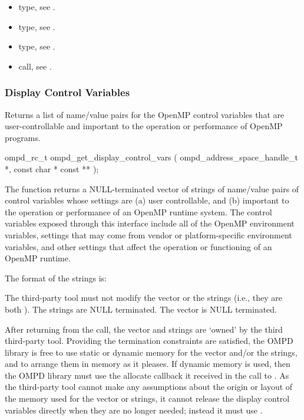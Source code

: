 \crossreferences
\begin{itemize}
	\item {} type, see .
	\item {} type, see .
	\item {} type, see .
	\item {} call, see 
	.
\end{itemize}


\subsubsection{Display Control Variables}

\label{subsubsubsec:ompd_get_display_control_vars}
\summary
Returns a list of name/value pairs for the OpenMP control variables
that are user-controllable and important to the operation or
performance of OpenMP programs.
\format
\begin{cspecific}
\begin{ompSyntax}
ompd_rc_t ompd_get_display_control_vars (
  ompd_address_space_handle_t *,
  const char * const **
);
\end{ompSyntax}
\end{cspecific}

\descr
The function  returns a
NULL-terminated vector of strings of name/value pairs of control
variables whose settings are (a) user controllable,
and (b) important to the operation or performance of an OpenMP
runtime system.
The control variables exposed through this interface include all
of the OpenMP environment variables, settings that may come from
vendor or platform-specific environment variables, and other
settings that affect the operation or functioning of an OpenMP
runtime.

The format of the strings is:
\begin{center}
\end{center}

The third-party tool must not modify the vector or the strings
(i.e., they are both ).
The strings are NULL terminated.
The vector is NULL terminated.

After returning from the call, the vector and strings are `owned'
by the third third-party tool.
Providing the termination constraints are satisfied, the OMPD library
is free to use static or dynamic memory for the
vector and/or the strings, and to arrange them in memory
as it pleases.
If dynamic memory is used, then the OMPD library must use
the allocate callback it received in the call to .
As the third-party tool cannot make any assumptions about the origin or
layout of the memory used for the vector or strings, it cannot release
the display control variables directly when they are no longer
needed; instead it must use .

